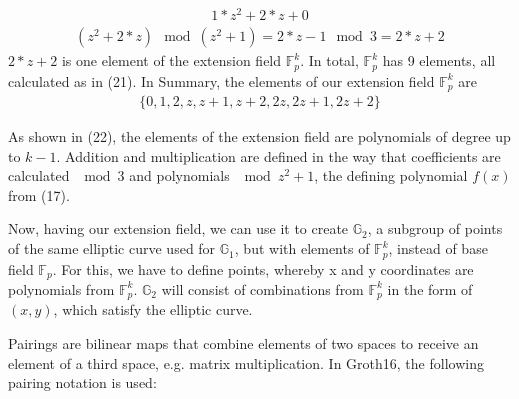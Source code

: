 \begin{align}
    1*z^2+2*z+0 
\end{align}   
\begin{align*}
    (z^2+2*z)\mod (z^2+1) = 2*z-1\mod 3 = 2*z+2
\end{align*}
\(2*z+2\) is one element of the extension field \begin{math}\mathbb{F}_p^k\end{math}. In total, \begin{math}\mathbb{F}_p^k\end{math} has 9 elements, all calculated as in (21). In Summary, the elements of our extension field \begin{math}\mathbb{F}_p^k\end{math} are
\begin{align}
\{0, 1, 2, z, z+1, z+2, 2z, 2z+1, 2z+2\}
\end{align}

As shown in (22), the elements of the extension field are polynomials of degree up to \(k-1\). Addition and multiplication are defined in the way that coefficients are calculated \(\mod 3\) and polynomials \(\mod z^2+1\), the defining polynomial  
\(f(x)\) from (17).

Now, having our extension field, we can use it to create \begin{math}\mathbb{G}_2\end{math}, a subgroup of points of the same elliptic curve used for \begin{math}\mathbb{G}_1\end{math}, but with elements of \begin{math}\mathbb{F}_p^k\end{math}, instead of base field \begin{math}\mathbb{F}_p\end{math}. For this, we have to define points, whereby x and y coordinates are polynomials from \begin{math}\mathbb{F}_p^k\end{math}. \begin{math}\mathbb{G}_2\end{math} will consist of combinations from \begin{math}\mathbb{F}_p^k\end{math} in the form of \((x,y)\), which satisfy the elliptic curve. 

Pairings are bilinear maps that combine elements of two spaces to receive an element of a third space, e.g. matrix multiplication. In Groth16, the following pairing notation is used:

